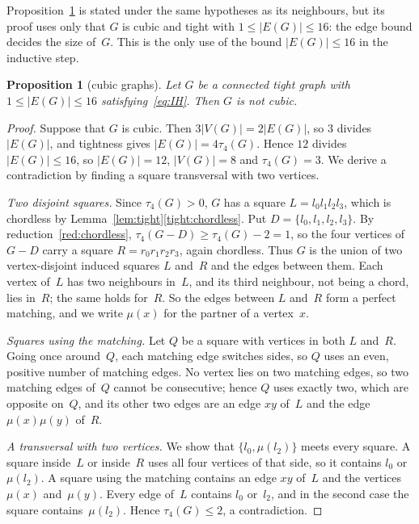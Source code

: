 \documentclass[11pt,letterpaper]{article}
\numberwithin{equation}{section}
\theoremstyle{plain}
\newtheorem{proposition}[theorem]{Proposition}
\theoremstyle{definition}
\theoremstyle{remark}
\begin{document}
Proposition~\ref{prop:cubic} is stated under the same hypotheses as its neighbours, but its proof uses only that $G$ is cubic and tight with $1\le|E(G)|\le16$: the edge bound decides the size of~$G$. This is the only use of the bound $|E(G)|\le16$ in the inductive step.

\begin{proposition}[cubic graphs]\label{prop:cubic}
Let $G$ be a connected tight graph with $1\le|E(G)|\le16$ satisfying~\eqref{eq:IH}. Then $G$ is not cubic.
\end{proposition}

\begin{proof}
Suppose that $G$ is cubic. Then $3|V(G)|=2|E(G)|$, so $3$ divides~$|E(G)|$, and tightness gives $|E(G)|=4\tau_4(G)$. Hence $12$ divides $|E(G)|\le16$, so $|E(G)|=12$, $|V(G)|=8$ and $\tau_4(G)=3$. We derive a contradiction by finding a square transversal with two vertices.

\emph{Two disjoint squares.} Since $\tau_4(G)>0$, $G$ has a square $L=l_0l_1l_2l_3$, which is chordless by Lemma~\ref{lem:tight}\ref{tight:chordless}. Put $D=\{l_0,l_1,l_2,l_3\}$. By reduction~\ref{red:chordless}, $\tau_4(G-D)\ge\tau_4(G)-2=1$, so the four vertices of $G-D$ carry a square $R=r_0r_1r_2r_3$, again chordless. Thus $G$ is the union of two vertex-disjoint induced squares $L$ and~$R$ and the edges between them. Each vertex of~$L$ has two neighbours in~$L$, and its third neighbour, not being a chord, lies in~$R$; the same holds for~$R$. So the edges between $L$ and~$R$ form a perfect matching, and we write $\mu(x)$ for the partner of a vertex~$x$.

\emph{Squares using the matching.} Let $Q$ be a square with vertices in both $L$ and~$R$. Going once around~$Q$, each matching edge switches sides, so $Q$ uses an even, positive number of matching edges. No vertex lies on two matching edges, so two matching edges of~$Q$ cannot be consecutive; hence $Q$ uses exactly two, which are opposite on~$Q$, and its other two edges are an edge $xy$ of~$L$ and the edge $\mu(x)\mu(y)$ of~$R$.

\emph{A transversal with two vertices.} We show that $\{l_0,\mu(l_2)\}$ meets every square. A square inside~$L$ or inside~$R$ uses all four vertices of that side, so it contains $l_0$ or~$\mu(l_2)$. A square using the matching contains an edge $xy$ of~$L$ and the vertices $\mu(x)$ and~$\mu(y)$. Every edge of~$L$ contains $l_0$ or~$l_2$, and in the second case the square contains~$\mu(l_2)$. Hence $\tau_4(G)\le2$, a contradiction.
\end{proof}
\end{document}

